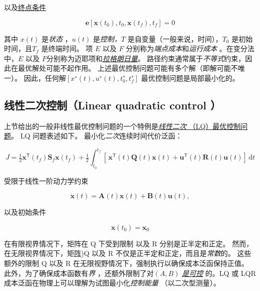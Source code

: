 以及\href{https://en.wikipedia.org/wiki/Boundary_condition}{终点条件}

\[
{\displaystyle {\textbf {e}}[{\textbf {x}}(t_{0}),t_{0},{\textbf {x}}(t_{f}),t_{f}]=0}
\]

其中 \(x ( t )\) 是\emph{状态} ，\(u ( t )\) 是\emph{控制，}\(T\) 是自变量（一般来说，时间），\(T_ 0\) 是初始时间，且\( T_ f\) 是终端时间。 项 \(E\) 以及 \(F\) 分别称为\emph{端点成本}和\emph{运行成本} 。在变分法中，\(E\) 以及 \(F\)分别称为迈耶项和\emph{\href{https://en.wikipedia.org/wiki/Lagrange_multiplier}{拉格朗日量}}。 路径约束通常属于\emph{不等式}约束，因此在最优解处可能不起作用。 上述最优控制问题可能有多个解（即解可能不唯一）。 因此，任何解\([ x^∗ ( t ) , u^∗ ( t ) , t_0^∗ , t_f^∗ ]\) 最优控制问题是局部最小化的。

\subsection{线性二次控制（Linear quadratic control ）}

上节给出的一般非线性最优控制问题的一个特例是\href{https://en.wikipedia.org/wiki/Linear-quadratic_regulator}{\emph{线性二次} （LQ）最优控制问题}。 LQ 问题表述如下。 最小化\emph{二次}连续时间代价泛函：

\[
{\displaystyle J={\tfrac {1}{2}}\mathbf {x} ^{\mathsf {T}}(t_{f})\mathbf {S} _{f}\mathbf {x} (t_{f})+{\tfrac {1}{2}}\int _{t_{0}}^{t_{f}}[\,\mathbf {x} ^{\mathsf {T}}(t)\mathbf {Q} (t)\mathbf {x} (t)+\mathbf {u} ^{\mathsf {T}}(t)\mathbf {R} (t)\mathbf {u} (t)]\,\mathrm {d} t}
\]

受限于线性一阶动力学约束

\[
{\displaystyle {\dot {\mathbf {x} }}(t)=\mathbf {A} (t)\mathbf {x} (t)+\mathbf {B} (t)\mathbf {u} (t),}
\]

以及初始条件

\[
{\displaystyle \mathbf {x} (t_{0})=\mathbf {x} _{0}}
\]

在有限视界情况下，矩阵在 Q 下受到限制 以及 R 分别是正半定和正定。 然而，在无限视界情况下，矩\href{https://en.wikipedia.org/wiki/Matrix_(mathematics}{阵})Q 以及 R 不仅是正半定和正定，而且是\emph{常数}的。 这些额外的限制 Q 以及 R 在无限视野情况下，强制执行以确保成本泛函保持正值。 此外，为了确保成本函数有\emph{界} ，还额外限制了对\(( A , B )\) \emph{\href{https://en.wikipedia.org/wiki/Controllability}{是可控}} 的。LQ 或 LQR 成本泛函在物理上可以理解为试图最小化\emph{控制能量} （以二次型测量）。

\[

\]

